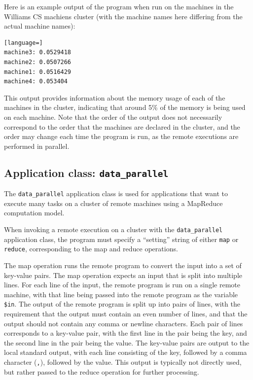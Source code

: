 \documentclass[twoside]{report}
\begin{document}
Here is an example output of the program when run on the machines in the Williams CS machiens cluster (with the machine names here differing from the actual machine names):

\begin{lstlisting}[language=]
machine3: 0.0529418
machine2: 0.0507266
machine1: 0.0516429
machine4: 0.053404
\end{lstlisting}

This output provides information about the memory usage of each of the machines in the cluster, indicating that around 5\% of the memory is being used on each machine.
Note that the order of the output does not necessarily correspond to the order that the machines are declared in the cluster, and the order may change each time the program is run, as the remote executions are performed in parallel.

\subsection{Application class: \texttt{data\_parallel}}

The \texttt{data\_parallel} application class is used for applications that want to execute many tasks on a cluster of remote machines using a MapReduce computation model.

When invoking a remote execution on a cluster with the \texttt{data\_parallel} application class, the program must specify a ``setting'' string of either \texttt{map} or \texttt{reduce}, corresponding to the map and reduce operations.

The map operation runs the remote program to convert the input into a set of key-value pairs.
The map operation expects an input that is split into multiple lines.
For each line of the input, the remote program is run on a single remote machine, with that line being passed into the remote program as the variable \texttt{\$in}.
The output of the remote program is split up into pairs of lines, with the requirement that the output must contain an even number of lines, and that the output should not contain any comma or newline characters.
Each pair of lines corresponds to a key-value pair, with the first line in the pair being the key, and the second line in the pair being the value.
The key-value pairs are output to the local standard output, with each line consisting of the key, followed by a comma character (\texttt{,}), followed by the value.
This output is typically not directly used, but rather passed to the reduce operation for further processing.
\end{document}
